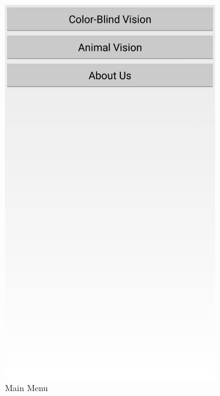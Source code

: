 \documentclass[12pt]{article}
\begin{document}
\begin{figure}[h]
\begin{subfigure}{.25\textwidth}
	\centering
	\includegraphics[width=.9\linewidth]{ApplicationScreenshots/MainMenu.jpg}
	\caption*{Main Menu}
\end{subfigure}%
\begin{subfigure}{.25\textwidth}
	\centering

\end{subfigure}
\end{figure}
\end{document}
